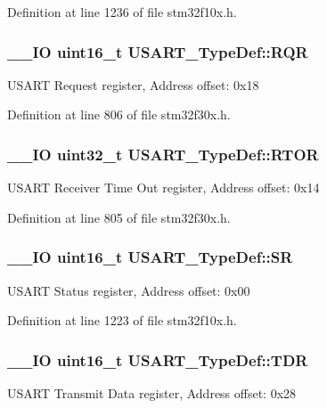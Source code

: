 Definition at line 1236 of file stm32f10x.\-h.

\hypertarget{struct_u_s_a_r_t___type_def_aa542aad2cd39707d95389a2bffc74083}{
\subsubsection[{R\-Q\-R}]{\setlength{\rightskip}{0pt plus 5cm}\-\_\-\-\_\-\-I\-O {\bf uint16\-\_\-t} U\-S\-A\-R\-T\-\_\-\-Type\-Def\-::\-R\-Q\-R}}\label{struct_u_s_a_r_t___type_def_aa542aad2cd39707d95389a2bffc74083}
U\-S\-A\-R\-T Request register, Address offset\-: 0x18 

Definition at line 806 of file stm32f30x.\-h.

\hypertarget{struct_u_s_a_r_t___type_def_a5732c379e1ce532552e80392db4eabf8}{
\subsubsection[{R\-T\-O\-R}]{\setlength{\rightskip}{0pt plus 5cm}\-\_\-\-\_\-\-I\-O {\bf uint32\-\_\-t} U\-S\-A\-R\-T\-\_\-\-Type\-Def\-::\-R\-T\-O\-R}}\label{struct_u_s_a_r_t___type_def_a5732c379e1ce532552e80392db4eabf8}
U\-S\-A\-R\-T Receiver Time Out register, Address offset\-: 0x14 

Definition at line 805 of file stm32f30x.\-h.

\hypertarget{struct_u_s_a_r_t___type_def_a3f1fd9f0c004d3087caeba4815faa41c}{
\subsubsection[{S\-R}]{\setlength{\rightskip}{0pt plus 5cm}\-\_\-\-\_\-\-I\-O {\bf uint16\-\_\-t} U\-S\-A\-R\-T\-\_\-\-Type\-Def\-::\-S\-R}}\label{struct_u_s_a_r_t___type_def_a3f1fd9f0c004d3087caeba4815faa41c}
U\-S\-A\-R\-T Status register, Address offset\-: 0x00 

Definition at line 1223 of file stm32f10x.\-h.

\hypertarget{struct_u_s_a_r_t___type_def_a010c9ef83a8236947a3bfaab1ed29df4}{
\subsubsection[{T\-D\-R}]{\setlength{\rightskip}{0pt plus 5cm}\-\_\-\-\_\-\-I\-O {\bf uint16\-\_\-t} U\-S\-A\-R\-T\-\_\-\-Type\-Def\-::\-T\-D\-R}}\label{struct_u_s_a_r_t___type_def_a010c9ef83a8236947a3bfaab1ed29df4}
U\-S\-A\-R\-T Transmit Data register, Address offset\-: 0x28 

